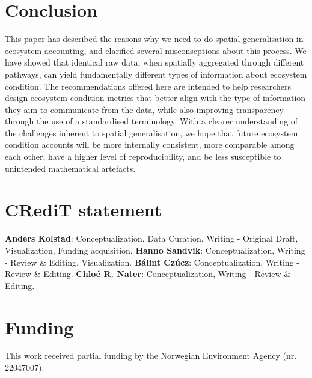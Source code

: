 \documentclass[
  authoryear,
  preprint,
  3p]{elsarticle}
\begin{document}
\section{Conclusion}\label{conclusion}

This paper has described the reasons why we need to do spatial
generalisation in ecosystem accounting, and clarified several
misconscptions about this process. We have showed that identical raw
data, when spatially aggregated through different pathways, can yield
fundamentally different types of information about ecosystem condition.
The recommendations offered here are intended to help researchers design
ecosystem condition metrics that better align with the type of
information they aim to communicate from the data, while also improving
transparency through the use of a standardised terminology. With a
clearer understanding of the challenges inherent to spatial
generalisation, we hope that future ecosystem condition accounts will be
more internally consistent, more comparable among each other, have a
higher level of reproducibility, and be less susceptible to unintended
mathematical artefacts.

\section{CRediT statement}\label{credit-statement}

\textbf{Anders Kolstad}: Conceptualization, Data Curation, Writing -
Original Draft, Visualization, Funding acquisition. \textbf{Hanno
Sandvik}: Conceptualization, Writing - Review \& Editing, Visualization.
\textbf{Bálint Czúcz}: Conceptualization, Writing - Review \& Editing.
\textbf{Chloé R. Nater}: Conceptualization, Writing - Review \& Editing.

\section{Funding}\label{funding}

This work received partial funding by the Norwegian Environment Agency
(nr. 22047007).


\renewcommand\refname{References}
  
\end{document}
